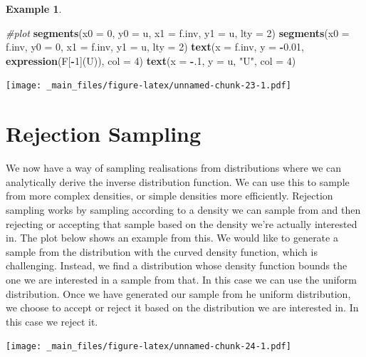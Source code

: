 \documentclass[
]{book}
\newenvironment{Shaded}{\begin{snugshade}}{\end{snugshade}}
\newcommand{\AttributeTok}[1]{\textcolor[rgb]{0.13,0.29,0.53}{#1}}
\newcommand{\CommentTok}[1]{\textcolor[rgb]{0.56,0.35,0.01}{\textit{#1}}}
\newcommand{\DecValTok}[1]{\textcolor[rgb]{0.00,0.00,0.81}{#1}}
\newcommand{\FloatTok}[1]{\textcolor[rgb]{0.00,0.00,0.81}{#1}}
\newcommand{\FunctionTok}[1]{\textcolor[rgb]{0.13,0.29,0.53}{\textbf{#1}}}
\newcommand{\NormalTok}[1]{#1}
\newcommand{\SpecialCharTok}[1]{\textcolor[rgb]{0.81,0.36,0.00}{\textbf{#1}}}
\newcommand{\StringTok}[1]{\textcolor[rgb]{0.31,0.60,0.02}{#1}}
\theoremstyle{definition}
\theoremstyle{definition}
\newtheorem{example}{Example}[chapter]
\theoremstyle{definition}
\theoremstyle{definition}
\theoremstyle{remark}
\begin{document}
\begin{example}
\begin{Shaded}
\begin{Highlighting}[]
\CommentTok{\#plot }
\FunctionTok{segments}\NormalTok{(}\AttributeTok{x0 =} \DecValTok{0}\NormalTok{, }\AttributeTok{y0 =}\NormalTok{ u, }\AttributeTok{x1 =}\NormalTok{ f.inv, }\AttributeTok{y1 =}\NormalTok{ u, }\AttributeTok{lty =} \DecValTok{2}\NormalTok{)}
\FunctionTok{segments}\NormalTok{(}\AttributeTok{x0 =}\NormalTok{ f.inv, }\AttributeTok{y0 =} \DecValTok{0}\NormalTok{, }\AttributeTok{x1 =}\NormalTok{ f.inv, }\AttributeTok{y1 =}\NormalTok{ u, }\AttributeTok{lty =} \DecValTok{2}\NormalTok{)}
\FunctionTok{text}\NormalTok{(}\AttributeTok{x =}\NormalTok{ f.inv, }\AttributeTok{y =} \SpecialCharTok{{-}}\FloatTok{0.01}\NormalTok{, }\FunctionTok{expression}\NormalTok{(F[}\SpecialCharTok{{-}}\DecValTok{1}\NormalTok{](U)), }\AttributeTok{col =} \DecValTok{4}\NormalTok{)}
\FunctionTok{text}\NormalTok{(}\AttributeTok{x =} \SpecialCharTok{{-}}\NormalTok{.}\DecValTok{1}\NormalTok{, }\AttributeTok{y =}\NormalTok{ u, }\StringTok{"U"}\NormalTok{, }\AttributeTok{col =} \DecValTok{4}\NormalTok{)}
\end{Highlighting}
\end{Shaded}

\texttt{[image: \_main\_files/figure-latex/unnamed-chunk-23-1.pdf]}
\end{example}

\hypertarget{rejection-sampling}{%
\section{Rejection Sampling}\label{rejection-sampling}}

We now have a way of sampling realisations from distributions where we can analytically derive the inverse distribution function. We can use this to sample from more complex densities, or simple densities more efficiently. Rejection sampling works by sampling according to a density we can sample from and then rejecting or accepting that sample based on the density we're actually interested in. The plot below shows an example from this. We would like to generate a sample from the distribution with the curved density function, which is challenging. Instead, we find a distribution whose density function bounds the one we are interested in a sample from that. In this case we can use the uniform distribution. Once we have generated our sample from he uniform distribution, we choose to accept or reject it based on the distribution we are interested in. In this case we reject it.

\texttt{[image: \_main\_files/figure-latex/unnamed-chunk-24-1.pdf]}
\end{document}
